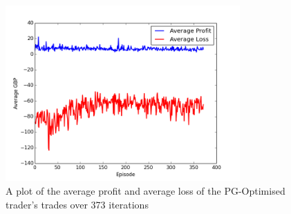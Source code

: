 \documentclass[ %
                    author={Ashwinder Khurana},
                supervisor={Prof Dave Cliff},
                    degree={MEng},
                     title={The Deeply Reinforced Trader},
                  subtitle={},
                      type={enterprise},
                      year={2020} ]{dissertation}
\begin{document}
{\begin{figure}[H] 
	\centering
  	\includegraphics[width=0.8\textwidth]{PG-Optimised-3-Loss-vs-Profit}
  	\caption{A plot of the average profit and average loss of the PG-Optimised trader's trades over 373 iterations }
	\label{fig:PG-Optimised-Loss-Vs-Profit}  
\end{figure}

}
\end{document}
